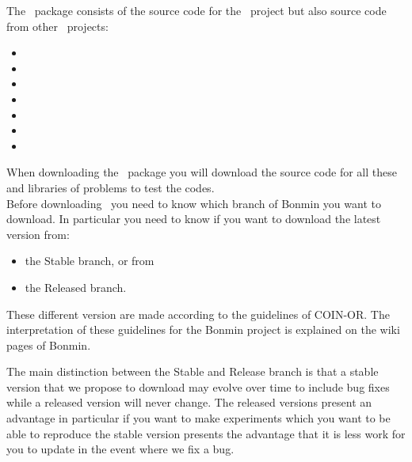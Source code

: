 \begin{PageSummary}
\end{PageSummary}

\begin{quickref}
\end{quickref}




The \Bonmin\ package consists of the source code for the \Bonmin\
project but also source code from other \COINOR\ projects:
\begin{itemize}
\item \BuildTools
\item \Cbc
\item \Cgl
\item \Clp
\item \CoinUtils
\item \Ipopt
\item \Osi
\end{itemize}

When downloading the \Bonmin\ package you will download the source code for all these and
libraries of problems to test the codes.\\

Before downloading \Bonmin\ you need to know which branch of Bonmin you want to download. 
In particular you need to know if you want to download the latest version from:
\begin{itemize}
    \item the Stable branch, or from
    \item the Released branch. 
\end{itemize}
These different version are made according to the guidelines of COIN-OR. The interpretation of these guidelines for the Bonmin project is explained on the wiki pages of Bonmin.

The main distinction between the Stable and Release branch is that a stable version that we propose to download may evolve over time to include bug fixes while a released version will never change. The released versions present an advantage in particular if you want to make experiments which you want to be able to reproduce the stable version presents the advantage that it is less work for you to update in the event where we fix a bug.

